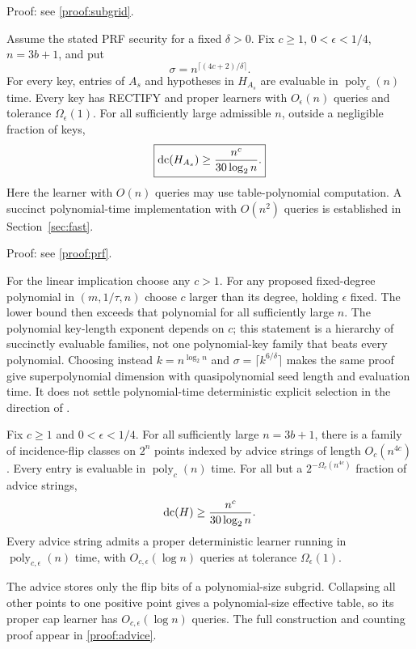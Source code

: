 \noindent Proof: see \cref{proof:subgrid}.\par



\begin{theorem}\label{thm:prf}
Assume the stated PRF security for a fixed $\delta>0$. Fix $c\ge1$, $0<\epsilon<1/4$, $n=3b+1$, and put
\[
 \sigma=n^{\lceil(4c+2)/\delta\rceil}.
\]
For every key, entries of $A_s$ and hypotheses in $H_{A_s}$ are evaluable in $\operatorname{poly}_c(n)$ time. Every key has RECTIFY and proper learners with $O_\epsilon(n)$ queries and tolerance $\Omega_\epsilon(1)$. For all sufficiently large admissible $n$, outside a negligible fraction of keys,
\[
 \boxed{\operatorname{dc}(H_{A_s})\ge\frac{n^c}{30\log_2n}.}
\]
Here the learner with $O(n)$ queries may use table-polynomial computation. A succinct polynomial-time implementation with $O(n^2)$ queries is established in Section~\ref{sec:fast}.
\end{theorem}

\noindent Proof: see \cref{proof:prf}.\par


For the linear implication choose any $c>1$. For any proposed fixed-degree polynomial in $(m,1/\tau,n)$ choose $c$ larger than its degree, holding $\epsilon$ fixed. The lower bound then exceeds that polynomial for all sufficiently large $n$. The polynomial key-length exponent depends on $c$; this statement is a hierarchy of succinctly evaluable families, not one polynomial-key family that beats every polynomial. Choosing instead $k=n^{\log_2n}$ and $\sigma=\lceil k^{6/\delta}\rceil$ makes the same proof give superpolynomial dimension with quasipolynomial seed length and evaluation time. It does not settle polynomial-time deterministic explicit selection in the direction of \citet[Problem~4.1]{HHPTZ22}.


\begin{proposition}\label{prop:advice}
Fix $c\ge1$ and $0<\epsilon<1/4$. For all sufficiently large $n=3b+1$, there is a family of incidence-flip classes on $2^n$ points indexed by advice strings of length $O_c(n^{4c})$. Every entry is evaluable in $\operatorname{poly}_c(n)$ time. For all but a $2^{-\Omega_c(n^{4c})}$ fraction of advice strings,
\[
 \operatorname{dc}(H)\ge\frac{n^c}{30\log_2 n}.
\]
Every advice string admits a proper deterministic learner running in $\operatorname{poly}_{c,\epsilon}(n)$ time, with $O_{c,\epsilon}(\log n)$ queries at tolerance $\Omega_\epsilon(1)$.
\end{proposition}
The advice stores only the flip bits of a polynomial-size subgrid. Collapsing all other points to one positive point gives a polynomial-size effective table, so its proper cap learner has $O_{c,\epsilon}(\log n)$ queries. The full construction and counting proof appear in \cref{proof:advice}.

